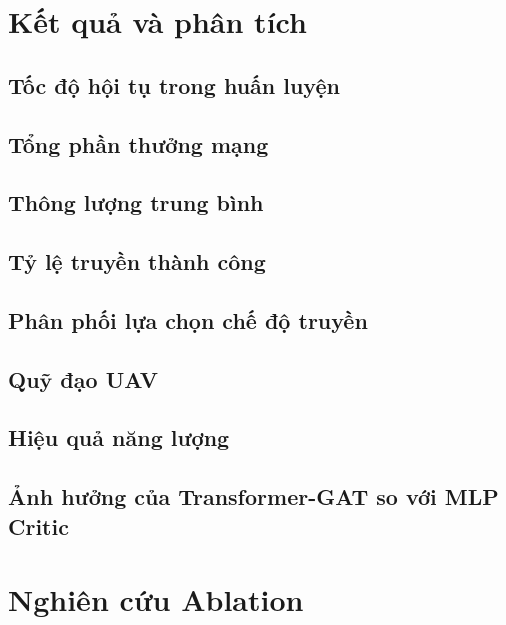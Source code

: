 \section{Kết quả và phân tích}
\label{sec:sim:results}

\subsection{Tốc độ hội tụ trong huấn luyện}
\label{subsec:sim:results:convergence}

\subsection{Tổng phần thưởng mạng}
\label{subsec:sim:results:reward}

\subsection{Thông lượng trung bình}
\label{subsec:sim:results:throughput}

\subsection{Tỷ lệ truyền thành công}
\label{subsec:sim:results:tsr}

\subsection{Phân phối lựa chọn chế độ truyền}
\label{subsec:sim:results:mode}

\subsection{Quỹ đạo UAV}
\label{subsec:sim:results:trajectory}

\subsection{Hiệu quả năng lượng}
\label{subsec:sim:results:energy}

\subsection{Ảnh hưởng của Transformer-GAT so với MLP Critic}
\label{subsec:sim:results:tgat-ablation}

\section{Nghiên cứu Ablation}
\label{sec:sim:ablation}

